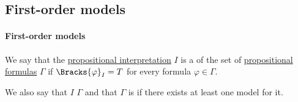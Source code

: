 \subsection{First-order models}\label{subsec:first_order_models}

\paragraph{First-order models}

\begin{definition}\label{def:propositional_model}
  We say that the \hyperref[def:propositional_valuation/interpretation]{propositional interpretation} \( I \) is a  of the set of \hyperref[def:propositional_grammar_schema/formula]{propositional formulas} \( \Gamma \) if \( \Bracks{\varphi}_I = T \) for every formula \( \varphi \in \Gamma \).

  We also say that \( I \)  \( \Gamma \) and that \( \Gamma \) is  if there exists at least one model for it.
\end{definition}

